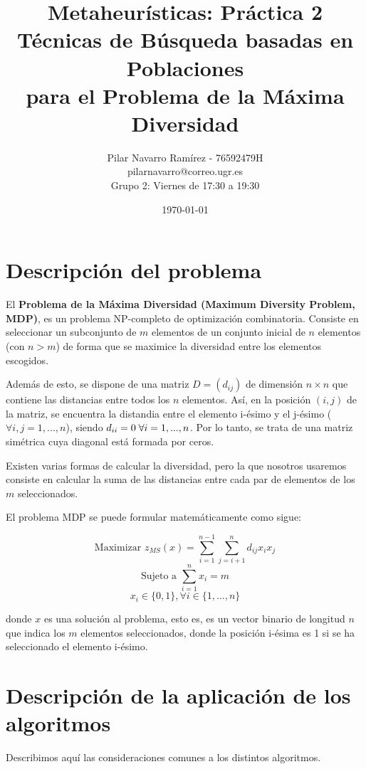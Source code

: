 \documentclass[10pt,a4paper]{article}
\title{\textbf{\huge Metaheurísticas: Práctica 2 }
	\\\medskip \Large Técnicas de Búsqueda basadas en Poblaciones\\ para el Problema de la Máxima Diversidad \\\medskip}
\author{Pilar Navarro Ramírez - 76592479H \\ pilarnavarro@correo.ugr.es \\ Grupo 2: Viernes de 17:30 a 19:30}
\date{ \today }
\begin{document}
	
	
	\maketitle 
	\newpage
	\tableofcontents
	\newpage
	
	
	\section{Descripción del problema}
	
	
	El \textbf{Problema de la Máxima Diversidad (Maximum Diversity Problem, MDP)}, es un problema NP-completo de optimización combinatoria. 
	Consiste en seleccionar un subconjunto de $m$ elementos de un conjunto inicial de $n$ elementos (con $n>m$) de forma que se maximice la diversidad entre los elementos escogidos.
	
	Además de esto, se dispone de una matriz $D=(d_{ij})$ de dimensión $n\times n$ que contiene las distancias entre todos los $ n $ elementos. Así, en la posición $(i,j)$ de la matriz, se encuentra la distandia entre el elemento i-ésimo y el j-ésimo ($\forall i,j=1,...,n$), siendo $d_{ii}=0\hspace{1mm}\forall i=1,...,n$. Por lo tanto, se trata de una matriz simétrica cuya diagonal está formada por ceros. 
	
	Existen varias formas de calcular la diversidad, pero la que nosotros usaremos consiste en calcular la suma de las distancias entre cada par de elementos de los $m$ seleccionados. 
	
	 El problema MDP se puede formular matemáticamente como sigue:
	
	$$ \text{Maximizar } z_{MS}(x) = \sum_{i=1}^{n-1} \sum_{j=i+1}^{n} d_{ij} x_i x_j $$
	$$ \text{Sujeto a } \sum_{i=1}^{n} x_i = m $$
	$$ x_i \in \{0,1\}, \forall i \in \{1,\dotsc,n\} $$
	
	donde $x$ es una solución al problema, esto es, es un vector binario de longitud $n$ que indica los $m$ elementos seleccionados, donde la posición i-ésima es 1 si se ha seleccionado el elemento i-ésimo.
	
	\newpage

	
	\section{Descripción de la aplicación de los algoritmos}
	
	Describimos aquí las consideraciones comunes a los distintos algoritmos.
	
\end{document}
